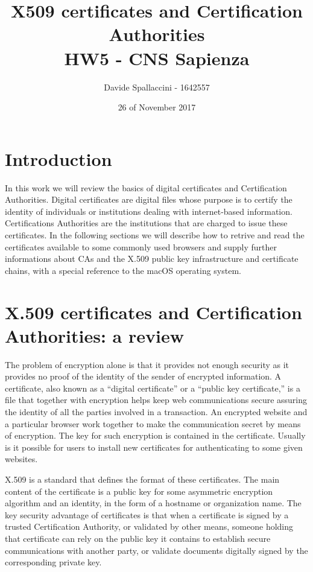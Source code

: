 \documentclass[11pt]{article}
\begin{document}
\title{X509 certificates and Certification Authorities\\ HW5 - CNS Sapienza}
\author{Davide Spallaccini - 1642557}
\date{26 of November 2017}
\maketitle

\section{Introduction}
In this work we will review the basics of digital certificates and Certification Authorities. Digital certificates are digital files whose purpose is to certify the identity of individuals or institutions dealing with internet-based information. Certifications Authorities are the institutions that are charged to issue these certificates. In the following sections we will describe how to retrive and read the certificates available to some commonly used browsers and supply further informations about CAs and the X.509 public key infrastructure and certificate chains, with a special reference to the macOS operating system.

\section{X.509 certificates and Certification Authorities: a review}
The problem of encryption alone is that it provides not enough security as it provides no proof of the identity of the sender of encrypted information. A certificate, also known as a “digital certificate” or a “public key certificate,” is a file that together with encryption helps keep web communications secure assuring the identity of all the parties involved in a transaction. An encrypted website and a particular browser work together to make the communication secret by means of encryption. The key for such encryption is contained in the certificate. Usually is it possible for users to install new certificates for authenticating to some given websites.

X.509 is a standard that defines the format of these certificates. The main content of the certificate is a public key for some asymmetric encryption algorithm and an identity, in the form of a hostname or organization name. The key security advantage of certificates is that when a certificate is signed by a trusted Certification Authority, or validated by other means, someone holding that certificate can rely on the public key it contains to establish secure communications with another party, or validate documents digitally signed by the corresponding private key.
\end{document}
